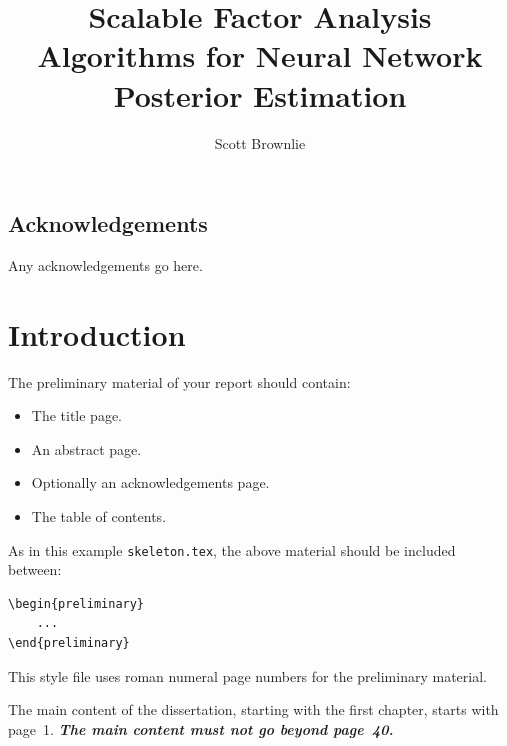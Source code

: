 \documentclass[msc,deptreport.inf]{infthesis} %
\begin{document}
\begin{preliminary}

\title{Scalable Factor Analysis Algorithms for Neural Network Posterior Estimation}

\author{Scott Brownlie}


\maketitle

\section*{Acknowledgements}
Any acknowledgements go here.

\tableofcontents
\end{preliminary}


\chapter{Introduction}

The preliminary material of your report should contain:
\begin{itemize}
\item
The title page.
\item
An abstract page.
\item
Optionally an acknowledgements page.
\item
The table of contents.
\end{itemize}

As in this example \texttt{skeleton.tex}, the above material should be
included between:
\begin{verbatim}
\begin{preliminary}
    ...
\end{preliminary}
\end{verbatim}
This style file uses roman numeral page numbers for the preliminary material.

The main content of the dissertation, starting with the first chapter,
starts with page~1. \emph{\textbf{The main content must not go beyond page~40.}}
\end{document}
